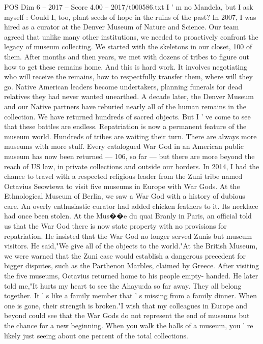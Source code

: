 \begin{textsample}{POS Dim 6 – 2017 – Score 4.00 – 2017/t000586.txt}
I ' m no Mandela, but I ask myself : Could I, too, plant seeds of hope in the ruins of the past?
In 2007, I was hired as a curator at the Denver Museum of Nature and Science.
Our team agreed that unlike many other institutions, we needed to proactively confront the legacy of museum collecting.
We started with the skeletons in our closet, 100 of them.
After months and then years, we met with dozens of tribes to figure out how to get these remains home.
And this is hard work.
It involves negotiating who will receive the remains, how to respectfully transfer them, where will they go.
Native American leaders become undertakers, planning funerals for dead relatives they had never wanted unearthed.
A decade later, the Denver Museum and our Native partners have reburied nearly all of the human remains in the collection.
We have returned hundreds of sacred objects.
But I ' ve come to see that these battles are endless.
Repatriation is now a permanent feature of the museum world.
Hundreds of tribes are waiting their turn.
There are always more museums with more stuff.
Every catalogued War God in an American public museum has now been returned — 106, so far — but there are more beyond the reach of US law, in private collections and outside our borders.
In 2014, I had the chance to travel with a respected religious leader from the Zuni tribe named Octavius Seowtewa to visit five museums in Europe with War Gods.
At the Ethnological Museum of Berlin, we saw a War God with a history of dubious care.
An overly enthusiastic curator had added chicken feathers to it.
Its necklace had once been stolen.
At the Mus{\EmojiFont �}{\EmojiFont �}e du quai Branly in Paris, an official told us that the War God there is now state property with no provisions for repatriation.
He insisted that the War God no longer served Zunis but museum visitors.
He said,"We give all of the objects to the world."At the British Museum, we were warned that the Zuni case would establish a dangerous precedent for bigger disputes, such as the Parthenon Marbles, claimed by Greece.
After visiting the five museums, Octavius returned home to his people empty- handed.
He later told me,"It hurts my heart to see the Ahayu:da so far away.
They all belong together.
It ' s like a family member that ' s missing from a family dinner.
When one is gone, their strength is broken."I wish that my colleagues in Europe and beyond could see that the War Gods do not represent the end of museums but the chance for a new beginning.
When you walk the halls of a museum, you ' re likely just seeing about one percent of the total collections.

\end{textsample}
